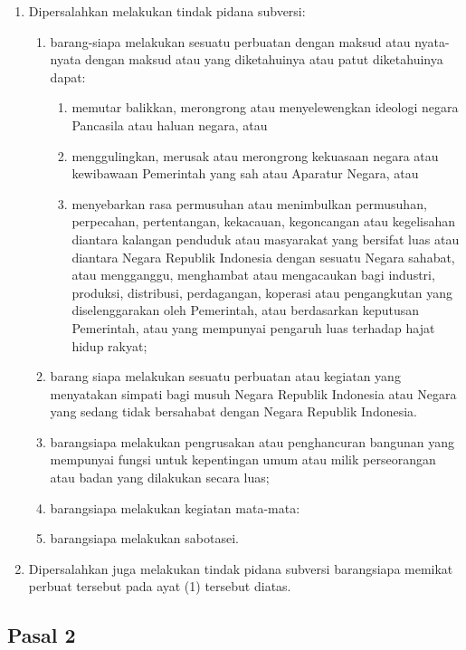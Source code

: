 \documentclass{article}
\begin{document}
\renewcommand{\labelenumi}{(\arabic{enumi}) }
\renewcommand{\labelenumii}{\alph{enumii}. }
\renewcommand{\labelenumiii}{\arabic{enumiii}. }
\begin{enumerate}
\item Dipersalahkan melakukan tindak pidana subversi:
\begin{enumerate}
\item  barang-siapa melakukan sesuatu perbuatan dengan maksud atau nyata-nyata dengan maksud
atau yang diketahuinya atau patut diketahuinya dapat:
\begin{enumerate}
\item memutar balikkan, merongrong atau menyelewengkan ideologi negara Pancasila atau
haluan negara, atau
\item menggulingkan, merusak atau merongrong kekuasaan negara atau kewibawaan
Pemerintah yang sah atau Aparatur Negara, atau
\item menyebarkan rasa permusuhan atau menimbulkan permusuhan, perpecahan,
pertentangan, kekacauan, kegoncangan atau kegelisahan diantara kalangan penduduk
atau masyarakat yang bersifat luas atau diantara Negara Republik Indonesia dengan
sesuatu Negara sahabat, atau mengganggu, menghambat atau mengacaukan bagi
industri, produksi, distribusi, perdagangan, koperasi atau pengangkutan yang
diselenggarakan oleh Pemerintah, atau berdasarkan keputusan Pemerintah, atau yang
mempunyai pengaruh luas terhadap hajat hidup rakyat;
\end{enumerate}
\item barang siapa melakukan sesuatu perbuatan atau kegiatan yang menyatakan simpati bagi
musuh Negara Republik Indonesia atau Negara yang sedang tidak bersahabat dengan Negara
Republik Indonesia.
\item barangsiapa melakukan pengrusakan atau penghancuran bangunan yang mempunyai fungsi
untuk kepentingan umum atau milik perseorangan atau badan yang dilakukan secara luas;
\item barangsiapa melakukan kegiatan mata-mata:
\item barangsiapa melakukan sabotasei.
\end{enumerate}
\item Dipersalahkan juga melakukan tindak pidana subversi barangsiapa memikat perbuat tersebut pada
ayat (1) tersebut diatas.
\end{enumerate}

\subsection*{\centering{}Pasal 2}
\end{document}
